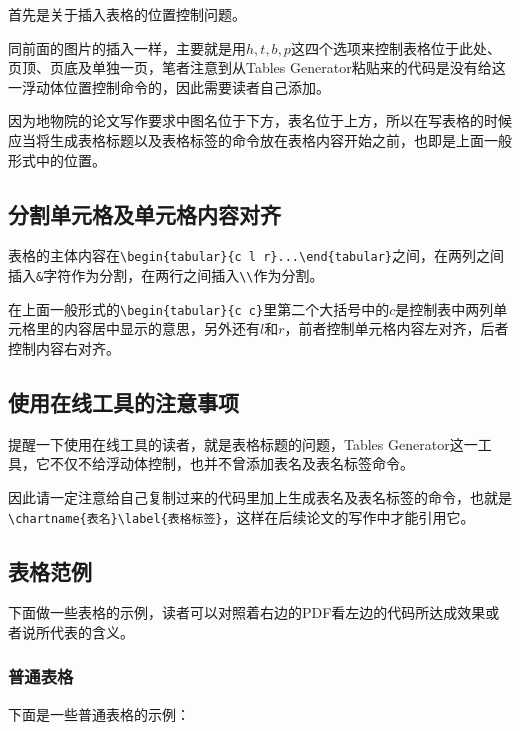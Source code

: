 首先是关于插入表格的位置控制问题。

同前面的图片的插入一样，主要就是用$h,t,b,p$这四个选项来控制表格位于此处、页顶、页底及单独一页，笔者注意到从Tables Generator粘贴来的代码是没有给这一浮动体位置控制命令的，因此需要读者自己添加。

因为地物院的论文写作要求中图名位于下方，表名位于上方，所以在写表格的时候应当将生成表格标题以及表格标签的命令放在表格内容开始之前，也即是上面一般形式中的位置。

\subsection{分割单元格及单元格内容对齐}

表格的主体内容在\verb|\begin{tabular}{c l r}...\end{tabular}|之间，在两列之间插入\verb|&|字符作为分割，在两行之间插入\verb|\\|作为分割。
\par
在上面一般形式的\verb|\begin{tabular}{c c}|里第二个大括号中的$c$是控制表中两列单元格里的内容居中显示的意思，另外还有$l$和$r$，前者控制单元格内容左对齐，后者控制内容右对齐。

\subsection{使用在线工具的注意事项}

提醒一下使用在线工具的读者，就是表格标题的问题，Tables Generator这一工具，它不仅不给浮动体控制，也并不曾添加表名及表名标签命令。\par 因此请一定注意给自己复制过来的代码里加上生成表名及表名标签的命令，也就是\verb|\chartname{表名}\label{表格标签}|，这样在后续论文的写作中才能引用它。

\subsection{表格范例}

下面做一些表格的示例，读者可以对照着右边的PDF看左边的代码所达成效果或者说所代表的含义。

\subsubsection{普通表格}

下面是一些普通表格的示例：


